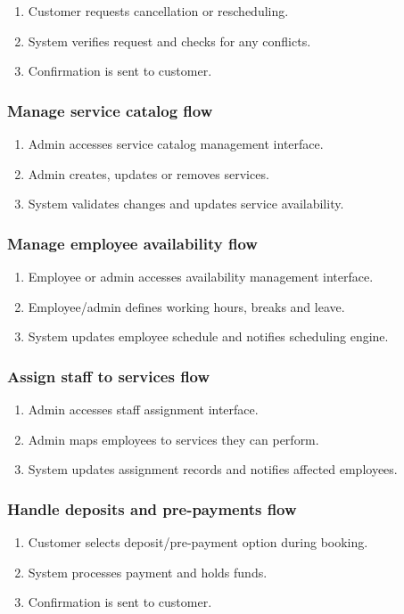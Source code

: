 \documentclass[]{VUMIFTemplateClass}
\begin{document}
\begin{enumerate}
    \item Customer requests cancellation or rescheduling.
    \item System verifies request and checks for any conflicts.
    \item Confirmation is sent to customer.
\end{enumerate}

\subsubsection{Manage service catalog flow}

\begin{enumerate}
    \item Admin accesses service catalog management interface.
    \item Admin creates, updates or removes services.
    \item System validates changes and updates service availability.
\end{enumerate}

\subsubsection{Manage employee availability flow}
\begin{enumerate}
    \item Employee or admin accesses availability management interface.
    \item Employee/admin defines working hours, breaks and leave.
    \item System updates employee schedule and notifies scheduling engine.
\end{enumerate}

\subsubsection{Assign staff to services flow}
\begin{enumerate}
    \item Admin accesses staff assignment interface.
    \item Admin maps employees to services they can perform.
    \item System updates assignment records and notifies affected employees.
\end{enumerate}

\subsubsection{Handle deposits and pre-payments flow}
\begin{enumerate}
    \item Customer selects deposit/pre-payment option during booking.
    \item System processes payment and holds funds.
    \item Confirmation is sent to customer.
\end{enumerate}
\end{document}
